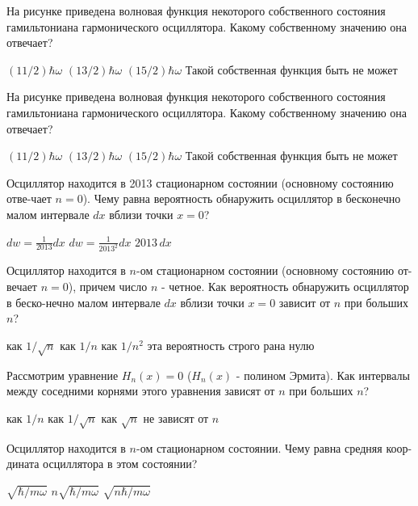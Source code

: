 \documentclass[11pt,a4paper]{exam}
\begin{document}
\begin{questions}
\question На рисунке приведена волновая функция некоторого собственного состояния гамильтониана гармонического осциллятора. Какому собственному значению она отвечает?
\begin{choices}
\choice $(11/2)\hbar \omega $         
\choice $(13/2)\hbar \omega $
\choice $(15/2)\hbar \omega $         
\choice Такой собственная функция быть не может
\end{choices}

\question На рисунке приведена волновая функция некоторого собственного состояния гамильтониана гармонического осциллятора. Какому собственному значению она отвечает?
\begin{choices}
\choice $(11/2)\hbar \omega $         
\choice $(13/2)\hbar \omega $
\choice $(15/2)\hbar \omega $         
\choice Такой собственная функция быть не может
\end{choices}

\question Осциллятор находится в 2013 стационарном состоянии (основному состоянию отве-чает $n=0$). Чему равна вероятность обнаружить осциллятор в бесконечно малом интервале $dx$ вблизи точки $x=0$?
\begin{choices}
\choice $dw=\frac{1}{2013}dx$      
\choice $dw=\frac{1}{{{2013}^{2}}}dx$    
\choice $2013\,dx$     
\end{choices}

\question Осциллятор находится в $n$-ом  стационарном состоянии (основному состоянию от-вечает $n=0$), причем число $n$ - четное. Как вероятность обнаружить осциллятор в беско-нечно малом интервале $dx$ вблизи точки $x=0$ зависит от $n$ при больших $n$?
\begin{choices}
\choice как $1/\sqrt{n}$        
\choice как $1/n$
\choice как $1/{{n}^{2}}$       
\choice эта вероятность строго рана нулю
\end{choices}

\question Рассмотрим уравнение ${{H}_{n}}(x)=0$ (${{H}_{n}}(x)$ - полином Эрмита). Как интервалы между соседними корнями этого уравнения зависят от $n$ при больших $n$?
\begin{choices}
\choice как $1/n$      
\choice как $1/\sqrt{n}$     
\choice как $\sqrt{n}$    
\choice не зависят от $n$
\end{choices}

\question Осциллятор находится в $n$-ом стационарном состоянии. Чему равна средняя коор-дината осциллятора в этом состоянии?
\begin{choices}
\choice $\sqrt{\hbar /m\omega }$      
\choice $n\sqrt{\hbar /m\omega }$     
\choice $\sqrt{n\hbar /m\omega }$     
\end{choices}


\end{questions}
\end{document}
